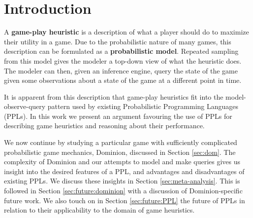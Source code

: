
\section{Introduction} \label{sec:intro}
A {\bf game-play heuristic} is a description of what a player should do to maximize their
utility in a game. Due to the probabilistic nature of many games, this description
can be formulated as a {\bf probabilistic model}. Repeated sampling from this model
gives the modeler a top-down view of what the heuristic does.
The modeler can then, given an inference engine, query the state of the game given
some observations about a state of the game at a different point in time.

It is apparent from this description that game-play heuristics fit
into the model-observe-query pattern used by existing Probabilistic Programming
Languages (PPLs).
In this work we present an argument favouring the use of PPLs
for describing game heuristics and reasoning about their performance.

We now continue by studying a particular game with sufficiently
complicated probabilistic game mechanics, Dominion, discussed in Section
\ref{sec:dom}.
The complexity of Dominion and our attempts to model and make queries gives
us insight into the desired features of a PPL, and advantages and disadvantages
of existing PPLs. We discuss these insights in Section \ref{sec:meta-analysis}.
This is followed in Section \ref{sec:future:dominion} with a discussion of
Dominion-specific future work. We also touch on in Section \ref{sec:future:PPL}
the future of PPLs in relation to their applicability to the domain of
game heuristics.




